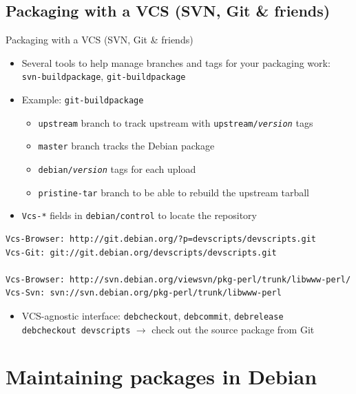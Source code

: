 \documentclass[10pt,final]{beamer}
\begin{document}
\subsection{Packaging with a VCS (SVN, Git \& friends)}
\begin{frame}[fragile]{Packaging with a VCS (SVN, Git \& friends)}
  \begin{itemize}
  \item Several tools to help manage branches and tags for your packaging work:\\
    \texttt{svn-buildpackage}, \texttt{git-buildpackage}
    \hbr
  \item Example: \texttt{git-buildpackage}
    \begin{itemize}
    \item \texttt{upstream} branch to track upstream with \texttt{upstream/\textsl{version}} tags
    \item \texttt{master} branch tracks the Debian package
    \item \texttt{debian/\textsl{version}} tags for each upload
    \item \texttt{pristine-tar} branch to be able to rebuild the upstream tarball
    \end{itemize}
    \hbr
  \item \texttt{Vcs-*} fields in \texttt{debian/control} to locate the repository
  \end{itemize}
  \begin{lstlisting}[basicstyle=\ttfamily\footnotesize]
Vcs-Browser: http://git.debian.org/?p=devscripts/devscripts.git
Vcs-Git: git://git.debian.org/devscripts/devscripts.git

Vcs-Browser: http://svn.debian.org/viewsvn/pkg-perl/trunk/libwww-perl/
Vcs-Svn: svn://svn.debian.org/pkg-perl/trunk/libwww-perl
  \end{lstlisting}
  \begin{itemize}
  \item VCS-agnostic interface: \texttt{debcheckout}, \texttt{debcommit},
    \texttt{debrelease}\\
    \texttt{debcheckout devscripts} $\rightarrow$ check out the source package
    from Git
\end{itemize}
\end{frame}

\section{Maintaining packages in Debian}
\end{document}
